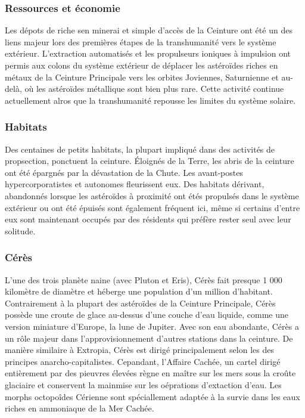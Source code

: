 \subsubsection{Ressources et économie} \label{sec:asteroid-resources-economics} 

Les dépots de riche sen minerai et simple d'accès de la Ceinture ont été un des liens majeur lors des premières étapes de la transhumanité vers le système extérieur. L'extraction automatisés et les propulseurs ioniques à impulsion ont permis aux colons du système extérieur de déplacer les astéroïdes riches en métaux de la Ceinture Principale vers les orbites Joviennes, Saturnienne et au-delà, où les astéroïdes métallique sont bien plus rare. Cette activité continue actuellement alros que la transhumanité repousse les limites du système solaire. 

\subsubsection{Habitats} \label{sec:habitats-3} 

Des centaines de petits habitats, la plupart impliqué dans des activités de propsection, ponctuent la ceinture. Éloignés de la Terre, les abris de la ceinture ont été épargnés par la dévastation de la Chute. Les avant-postes hypercorporatistes et autonomes fleurissent eux. Des habitats dérivant, abandonnés lorsque les astéroïdes à proximité ont étés propulsés dans le système extérieur ou ont été épuisés sont également fréquent ici, même si certains d'entre eux sont maintenant occupés par des résidents qui préfère rester seul avec leur solitude. 

\subsubsection{Cérès} \label{sec:ceres} 

L'une des trois planète naine (avec Pluton et Eris), Cérès fait presque 1 000 kilomètre de diamètre et héberge une population d'un million d'habitant. Contrairement à la plupart des astéroïdes de la Ceinture Principale, Cérès possède une croute de glace au-dessus d'une couche d'eau liquide, comme une version miniature d'Europe, la lune de Jupiter. Avec son eau abondante, Cérès a un rôle majeur dans l'approvisionnement d'autres stations dans la ceinture. De manière similaire à Extropia, Cérès est dirigé principalement selon les des principes anarcho-capitalistes. Cepandant, l'Affaire Cachée, un cartel dirigé entièrement par des pieuvres élevées règne en maître sur les mers sous la croûte glaciaire et conservent la mainmise sur les oéprations d'extaction d'eau. Les morphs octopoîdes Cérienne sont spéciallement adaptée à la survie dans les eaux riches en ammoniaque de la Mer Cachée. 


